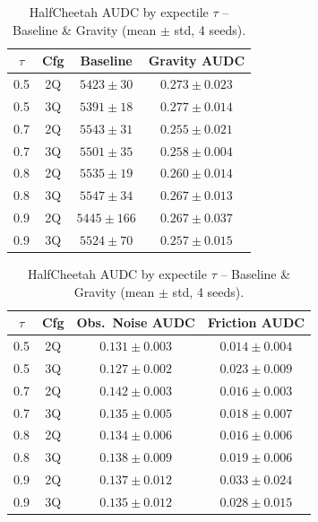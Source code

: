 \documentclass[conference]{IEEEtran}
\begin{document}
\begin{table}[t]
  \centering
  \caption{HalfCheetah AUDC by expectile $\tau$ -- Baseline \& Gravity
           (mean $\pm$ std, 4 seeds).}
  \label{tab:tau-halfcheetah}
  \small
  \begin{tabular}{cccc}
    \toprule
    $\tau$ & Cfg & Baseline & Gravity AUDC \\
    \midrule
    0.5 & 2Q & $5423\pm30$  & $0.273\pm0.023$ \\
    0.5 & 3Q & $5391\pm18$  & $0.277\pm0.014$ \\
    0.7 & 2Q & $5543\pm31$  & $0.255\pm0.021$ \\
    0.7 & 3Q & $5501\pm35$  & $0.258\pm0.004$ \\
    0.8 & 2Q & $5535\pm19$  & $0.260\pm0.014$ \\
    0.8 & 3Q & $5547\pm34$  & $0.267\pm0.013$ \\
    0.9 & 2Q & $5445\pm166$ & $0.267\pm0.037$ \\
    0.9 & 3Q & $5524\pm70$  & $0.257\pm0.015$ \\
    \bottomrule
  \end{tabular}

  \vspace{4pt}

  \begin{tabular}{cccc}
    \toprule
    $\tau$ & Cfg & Obs.\ Noise AUDC & Friction AUDC \\
    \midrule
    0.5 & 2Q & $0.131\pm0.003$ & $0.014\pm0.004$ \\
    0.5 & 3Q & $0.127\pm0.002$ & $0.023\pm0.009$ \\
    0.7 & 2Q & $0.142\pm0.003$ & $0.016\pm0.003$ \\
    0.7 & 3Q & $0.135\pm0.005$ & $0.018\pm0.007$ \\
    0.8 & 2Q & $0.134\pm0.006$ & $0.016\pm0.006$ \\
    0.8 & 3Q & $0.138\pm0.009$ & $0.019\pm0.006$ \\
    0.9 & 2Q & $0.137\pm0.012$ & $0.033\pm0.024$ \\
    0.9 & 3Q & $0.135\pm0.012$ & $0.028\pm0.015$ \\
    \bottomrule
  \end{tabular}
\end{table}
\end{document}

